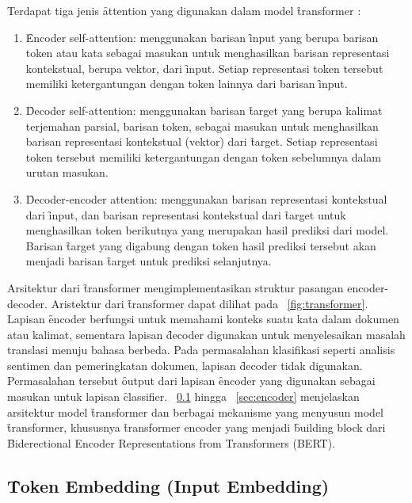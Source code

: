 	Terdapat tiga jenis \f{attention} yang digunakan dalam model \f{transformer} \citep{transformerori}:
	\begin{enumerate}
		\item \f{Encoder self-attention}: menggunakan barisan \f{input} yang berupa barisan token atau kata sebagai masukan untuk menghasilkan barisan representasi kontekstual, berupa vektor, dari \f{input}. Setiap representasi token tersebut memiliki ketergantungan dengan token lainnya dari barisan \f{input}.
		\item \f{Decoder self-attention}: menggunakan barisan \f{target} yang berupa kalimat terjemahan parsial, barisan token, sebagai masukan untuk menghasilkan barisan representasi kontekstual (vektor) dari \f{target}. Setiap representasi token tersebut memiliki ketergantungan dengan token sebelumnya dalam urutan masukan.
		\item \f{Decoder-encoder attention}: menggunakan barisan representasi kontekstual dari \f{input}, dan barisan representasi kontekstual dari \f{target} untuk menghasilkan token berikutnya yang merupakan hasil prediksi dari model. Barisan \f{target} yang digabung dengan token hasil prediksi tersebut akan menjadi barisan \f{target} untuk prediksi selanjutnya.
	\end{enumerate}

	Arsitektur dari \f{transformer} mengimplementasikan struktur pasangan encoder-decoder. Aristektur dari \f{transformer} dapat dilihat pada \pic~\ref{fig:transformer}. Lapisan \f{encoder} berfungsi untuk memahami konteks suatu kata dalam dokumen atau kalimat, sementara lapisan \f{decoder} digunakan untuk menyelesaikan masalah translasi menuju bahasa berbeda. Pada permasalahan klasifikasi seperti analisis sentimen dan pemeringkatan dokumen, lapisan \f{decoder} tidak digunakan. Permasalahan tersebut \f{output} dari lapisan \f{encoder} yang digunakan sebagai masukan untuk lapisan \f{classifier}. \sect~\ref{sec:token-embedding} hingga \sect~\ref{sec:encoder} menjelaskan arsitektur model \f{transformer} dan berbagai mekanisme yang menyusun model \f{transformer}, khususnya \f{transformer encoder} yang menjadi \f{building block} dari \f{Biderectional Encoder Representations from Transformers} (BERT).

	\subsection{\f{Token Embedding (Input Embedding)}}
	\label{sec:token-embedding}

